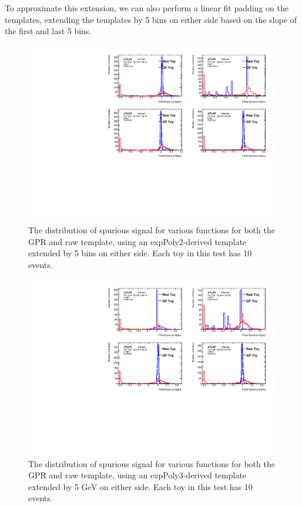 To approximate this extension, we can also perform a linear fit padding on the templates, extending the templates by 5 bins on either side based on the slope of the first and last 5 bins. 
\begin{figure} 
\begin{center}
  \includegraphics[width=\textwidth]{figures/background/gpr/validation/padded/ToyTest_FitSigVals_lowpT_10_noSig}   
\caption{The distribution of spurious signal for various functions for both the GPR and raw template, using an expPoly2-derived template extended by 5 bins on either side. Each toy in this test has 10 events.}
\label{fig:padded_lowpt_10_noSig}
\end{center}
\end{figure}

\begin{figure} 
\begin{center}
  \includegraphics[width=\textwidth]{figures/background/gpr/validation/padded/ToyTest_FitSigVals_medpT_10_noSig}   
\caption{The distribution of spurious signal for various functions for both the GPR and raw template, using an expPoly3-derived template extended by 5 GeV on either side. Each toy in this test has 10 events.}
\label{fig:padded_medpt_10_noSig}
\end{center}
\end{figure}

